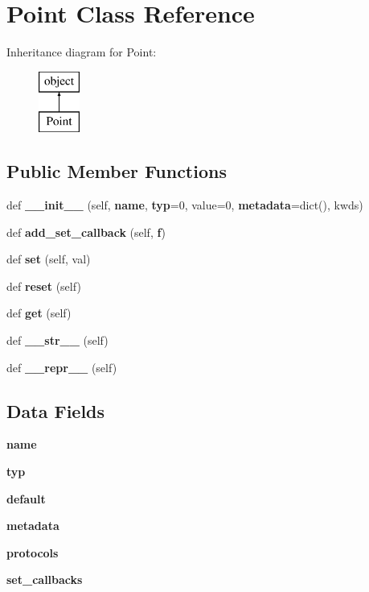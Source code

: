 \section{Point Class Reference}
\label{classpoint_1_1_point}
Inheritance diagram for Point\+:\begin{figure}[H]
\begin{center}
\leavevmode
\includegraphics[height=2.000000cm]{classpoint_1_1_point}
\end{center}
\end{figure}
\subsection*{Public Member Functions}
\begin{DoxyCompactItemize}
\item 
def {\bf \+\_\+\+\_\+init\+\_\+\+\_\+} (self, {\bf name}, {\bf typ}=0, value=0, {\bf metadata}=dict(), kwds)
\item 
def {\bf add\+\_\+set\+\_\+callback} (self, {\bf f})
\item 
def {\bf set} (self, val)
\item 
def {\bf reset} (self)
\item 
def {\bf get} (self)
\item 
def {\bf \+\_\+\+\_\+str\+\_\+\+\_\+} (self)
\item 
def {\bf \+\_\+\+\_\+repr\+\_\+\+\_\+} (self)
\end{DoxyCompactItemize}
\subsection*{Data Fields}
\begin{DoxyCompactItemize}
\item 
{\bf name}
\item 
{\bf typ}
\item 
{\bf default}
\item 
{\bf metadata}
\item 
{\bf protocols}
\item 
{\bf set\+\_\+callbacks}
\end{DoxyCompactItemize}


